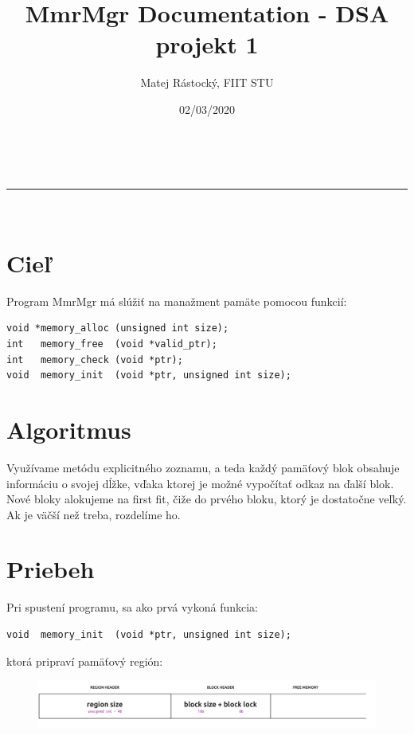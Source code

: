 \documentclass[a4paper,11pt]{article}
\makeatletter
\newcommand{\linia}{\rule{\linewidth}{0.5pt}}
\theoremstyle{mytheor}
\renewcommand{\maketitle}{
\begin{center}
\vspace{2ex}
{\huge \textsc{\@title}}
\vspace{1ex}
\\
\linia\\
\@author \hfill \@date
\vspace{4ex}
\end{center}
}
\makeatother
\begin{document}
\title{MmrMgr Documentation - DSA projekt 1}

\author{Matej Rástocký, FIIT STU}

\date{02/03/2020}

\maketitle

\section*{Cieľ}

Program MmrMgr má slúžiť na manažment pamäte pomocou funkcií:

\begin{lstlisting}
void *memory_alloc (unsigned int size);
int   memory_free  (void *valid_ptr);
int   memory_check (void *ptr);
void  memory_init  (void *ptr, unsigned int size);
\end{lstlisting}

\section*{Algoritmus}

Využívame metódu explicitného zoznamu, a teda každý pamäťový blok obsahuje informáciu o svojej dĺžke, vďaka ktorej je možné vypočítať odkaz na ďalší blok. Nové bloky alokujeme na first fit, čiže do prvého bloku, ktorý je dostatočne veľký. Ak je väčší než treba, rozdelíme ho.

\section*{Priebeh}

Pri spustení programu, sa ako prvá vykoná funkcia:

\begin{lstlisting}
void  memory_init  (void *ptr, unsigned int size);
\end{lstlisting}

ktorá pripraví pamäťový región:

\begin{figure}[h!]
	\includegraphics[width=\linewidth]{memory_init.png}
\end{figure}
\end{document}
